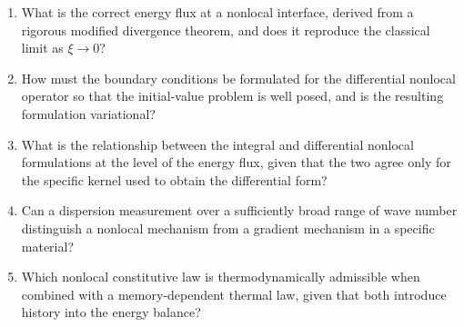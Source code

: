 \begin{enumerate}[label=\textbf{OQ7.\arabic*}]
\item What is the correct energy flux at a nonlocal interface, derived from a rigorous modified divergence theorem, and does it reproduce the classical limit as $\xi \to 0$? \label{oq:7.1}
\item How must the boundary conditions be formulated for the differential nonlocal operator so that the initial-value problem is well posed, and is the resulting formulation variational? \label{oq:7.2}
\item What is the relationship between the integral and differential nonlocal formulations at the level of the energy flux, given that the two agree only for the specific kernel used to obtain the differential form? \label{oq:7.3}
\item Can a dispersion measurement over a sufficiently broad range of wave number distinguish a nonlocal mechanism from a gradient mechanism in a specific material? \label{oq:7.4}
\item Which nonlocal constitutive law is thermodynamically admissible when combined with a memory-dependent thermal law, given that both introduce history into the energy balance? \label{oq:7.5}
\end{enumerate}

